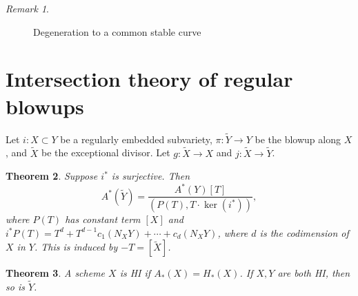 \documentclass[leqno, openany]{memoir}
\newtheorem{thm}{Theorem}[section]
\theoremstyle{definition}
\theoremstyle{remark}
\newtheorem{rmk}[thm]{Remark}
\theoremstyle{plain}
\theoremstyle{definition}
\theoremstyle{remark}
\newcommand{\wt}[1]{\widetilde{#1}}
\begin{document}
\begin{rmk}
\begin{enumerate}
\begin{figure}[htpb]
\begin{center}
                                                \end{center}
                                                \caption{Degeneration to a
                                                common stable curve}%
                                        \label{fig:degen} \end{figure}
                                \end{enumerate} \end{rmk}

\section{Intersection theory of regular blowups}%
\label{sec:intersection_theory_of_regular_blowups}

Let $i \colon X \subset Y$ be a regularly embedded subvariety, $\pi \colon
\wt{Y} \to Y$ be the blowup along $X$, and $\wt{X}$ be the exceptional divisor.
Let $g \colon \wt{X} \to X$ and $j \colon \wt{X} \to \wt{Y}$.

\begin{thm} Suppose $i^*$ is surjective. Then \[ A^*(\wt{Y}) =
\frac{A^*(Y)[T]}{(P(T), T \cdot \ker(i^*))}, \] where $P(T)$ has constant term
$[X]$ and $i^* P(T) = T^d + T^{d-1} c_1(N_X Y) + \cdots + c_d(N_X Y)$, where
$d$ is the codimension of $X$ in $Y$. This is induced by $-T = [\wt{X}]$.
\end{thm}

\begin{thm} A scheme $X$ is HI if $A_*(X) = H_*(X)$. If $X, Y$ are both HI,
then so is $\wt{Y}$.  \end{thm}
\end{document}
